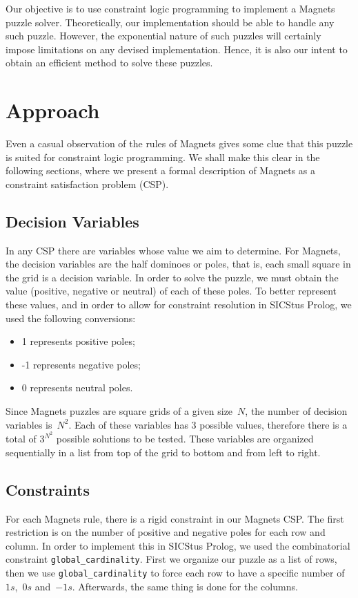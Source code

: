 \documentclass{llncs}
\begin{document}
Our objective is to use constraint logic programming to implement a Magnets puzzle solver. Theoretically, our implementation should be able to handle any such puzzle. However, the exponential nature of such puzzles will certainly impose limitations on any devised implementation. Hence, it is also our intent to obtain an efficient method to solve these puzzles.


\section{Approach}

Even a casual observation of the rules of Magnets gives some clue that this puzzle is suited for constraint logic programming. We shall make this clear in the following sections, where we present a formal description of Magnets as a constraint satisfaction problem (CSP).

\subsection{Decision Variables} 

In any CSP there are variables whose value we aim to determine. For Magnets, the decision variables are the half dominoes or poles, that is, each small square in the grid is a decision variable. In order to solve the puzzle, we must obtain the value (positive, negative or neutral) of each of these poles. To better represent these values, and in order to allow for constraint resolution in SICStus Prolog, we used the following conversions:
\begin{itemize}
	\item 1 represents positive poles;
	\item -1 represents negative poles;
	\item 0 represents neutral poles. 
\end{itemize}

Since Magnets puzzles are square grids of a given size~$N$, the number of decision variables is~$N^2$. Each of these variables has 3 possible values, therefore there is a total of $3^{N^2}$ possible solutions to be tested. These variables are organized sequentially in a list from top of the grid to bottom and from left to right.

\subsection{Constraints} 

For each Magnets rule, there is a rigid constraint in our Magnets CSP. The first restriction is on the number of positive and negative poles for each row and column. In order to implement this in SICStus Prolog, we used the combinatorial constraint \verb|global_cardinality|. First we organize our puzzle as a list of rows, then we use \verb|global_cardinality| to force each row to have a specific number of~$1s$,~$0s$ and~$-1s$. Afterwards, the same thing is done for the columns.
\end{document}
